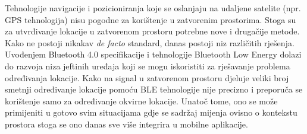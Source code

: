 \begin{sazetak}

Tehnologije navigacije i pozicioniranja koje se oslanjaju na udaljene satelite (npr. GPS tehnologija) nisu pogodne za korištenje u zatvorenim prostorima. 
Stoga su za utvrđivanje lokacije u zatvorenom prostoru potrebne nove i drugačije metode. 
Kako ne postoji nikakav \textit{de facto} standard, danas postoji niz različitih rješenja. 
Uvođenjem Bluetooth 4.0 specifikacije i tehnologije Bluetooth Low Energy dolazi do razvoja niza jeftinih uređaja koji se mogu iskoristiti za rješavanje problema određivanja lokacije. 
Kako na signal u zatvorenom prostoru djeluje veliki broj smetnji određivanje lokacije pomoću BLE tehnologije nije precizno i preporuča se korištenje samo za određivanje okvirne lokacije. 
Unatoč tome, ono se može primijeniti u gotovo svim situacijama gdje se sadržaj mijenja ovisno o kontekstu prostora stoga se ono danas sve više integrira u mobilne aplikacije. 

\end{sazetak}

\begin{abstract}

\end{abstract}